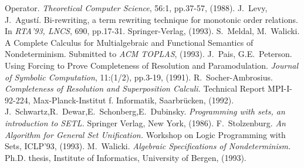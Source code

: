\begin{thebibliography}{MM99}
   Operator. {\it Theoretical Computer Science}, 56:1, pp.37-57, (1988).
 J.~Levy, J.~Agust\'i. Bi-rewriting, a term rewriting
   technique for monotonic order relations. In {\em RTA'93, LNCS}, 
   690, pp.17-31. Springer-Verlag, (1993).
 S.~Meldal, M.~Walicki. A Complete Calculus for 
   Multialgebraic and Functional Semantics of Nondeterminism. 
   Submitted to {\em ACM TOPLAS}, (1993).
 J.~Pais, G.E.~Peterson. Using Forcing to Prove Completeness
   of Resolution and Paramodulation. {\em Journal of Symbolic Computation}, 
   11:(1/2), pp.3-19, (1991).
 R.~Socher-Ambrosius. 
   {\em Completeness of Resolution and Superposition Calculi.}
   Technical Report
   MPI-I-92-224, Max-Planck-Institut f. Informatik, Saarbr\"ucken, (1992).
 J.~Schwartz,R.~Dewar,E.~Schonberg,E.~Dubinsky. 
   {\em Programming with sets, an introduction to SETL. }
   Springer Verlag, New York, (1986).
 F.~Stolzenburg. 
   {\em An Algorithm for General Set Unification.}
   Workshop on Logic Programming with Sets, ICLP'93, (1993).
 M.~Walicki. 
   {\em Algebraic Specifications of Nondeterminism.}
   Ph.D. thesis, Institute of Informatics, University of Bergen, (1993).
\end{thebibliography} 

